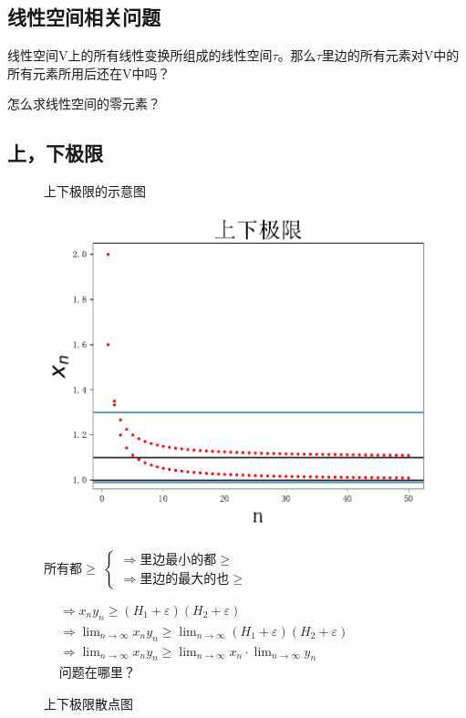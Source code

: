 \documentclass[fontset=windows]{article}
\begin{document}
    

    \subsection{线性空间相关问题}

    线性空间V上的所有线性变换所组成的线性空间$\tau$。那么$\tau$里边的所有元素对V中的所有元素所用后还在V中吗？

    怎么求线性空间的零元素？
    \newpage
    \subsection{上，下极限}
    \begin{figure}[!htb]
    \begin{minipage}[t]{0.5\linewidth}
        上下极限的示意图

        \includegraphics[scale=0.5]{tikz/上下极限散点图.pdf}
        \caption{上下极限散点图}
    \end{minipage}
    \vline
    \begin{minipage}[t]{0.5\linewidth}
        \vspace*{30pt}
        所有都$\ge$
        $    
        \begin{cases}
            \Longrightarrow \text{里边最小的都}\ge\\ 
            \Longrightarrow \text{里边的最大的也}\ge 
        \end{cases}
        $

        \noindent
        $
        \begin{aligned}
            &\Longrightarrow x_n y_n \ge (H_1+\varepsilon)(H_2 + \varepsilon)\\ 
            &\Longrightarrow \lim_{n\to \infty}{x_ny_n} \ge \lim_{n\to \infty}{(H_1+\varepsilon)(H_2 + \varepsilon)}\\ 
            &\Longrightarrow \lim_{n\to \infty}{x_n y_n }\ge \lim_{n\to \infty}{x_n}\cdot \lim_{n\to \infty}{y_n}\\ 
            &\text{问题在哪里？}
        \end{aligned}
        $        
    \end{minipage}
    \end{figure}
\end{document}
